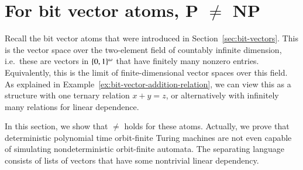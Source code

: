 \section{For bit vector atoms, P 
\texorpdfstring{$\neq$}{!=}
NP}
\label{sec:pnp-bitvector}
Recall the bit vector atoms that were introduced in Section~\ref{sec:bit-vectors}.  This is the vector space over the two-element field of countably infinite dimension, i.e.~these are vectors in $\{0,1\}^\omega$ that have finitely many nonzero entries. Equivalently, this is the \fraisse limit of finite-dimensional vector spaces over this field.  As explained in Example~\ref{ex:bit-vector-addition-relation}, we can view this as a structure with one ternary relation $x+y=z$, or alternatively with infinitely many relations for linear dependence. 

In this section, we show that { $\neq$ } holds for these atoms.  Actually, we prove that deterministic polynomial time orbit-finite Turing machines are not even capable of simulating  nondeterministic orbit-finite automata. The separating language consists of lists of vectors that have some nontrivial linear dependency.

